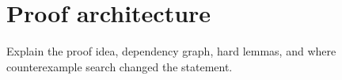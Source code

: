 \section{Proof architecture}
Explain the proof idea, dependency graph, hard lemmas, and where counterexample search changed the statement.
